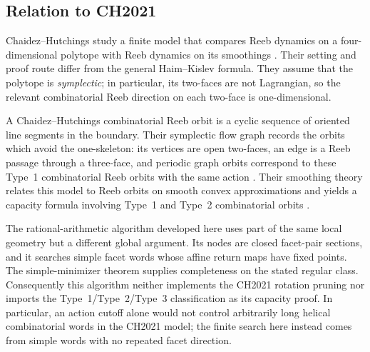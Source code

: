 \subsection{Relation to CH2021}
\label{subsec:flow-graph-algorithm-ch2021-relation-to-ch2021}

Chaidez--Hutchings study a finite model that compares Reeb dynamics on a
four-dimensional polytope with Reeb dynamics on its smoothings
\cite{CH2021}.  Their setting and proof route differ from the general
Haim--Kislev formula.  They assume that the polytope is \emph{symplectic}; in
particular, its two-faces are not Lagrangian, so the relevant combinatorial
Reeb direction on each two-face is one-dimensional.

A Chaidez--Hutchings combinatorial Reeb orbit is a cyclic sequence of oriented
line segments in the boundary.  Their symplectic flow graph records the orbits
which avoid the one-skeleton: its vertices are open two-faces, an edge is a
Reeb passage through a three-face, and periodic graph orbits correspond to
these Type~1 combinatorial Reeb orbits with the same action
\cite[Proposition~2.14]{CH2021}.  Their smoothing theory relates this model to
Reeb orbits on smooth convex approximations and yields a capacity formula
involving Type~1 and Type~2 combinatorial orbits
\cite[Theorems~1.11 and~1.12, Corollary~1.15]{CH2021}.

The rational-arithmetic algorithm developed here uses part of the same local
geometry but a
different global argument.  Its nodes are closed facet-pair sections, and it
searches simple facet words whose affine return maps have fixed points.  The
simple-minimizer theorem supplies completeness on the stated regular class.
Consequently this algorithm neither implements the CH2021 rotation pruning nor
imports the Type~1/Type~2/Type~3 classification as its capacity proof.  In
particular, an action cutoff alone would not control arbitrarily long helical
combinatorial words in the CH2021 model; the finite search here instead comes
from simple words with no repeated facet direction.

